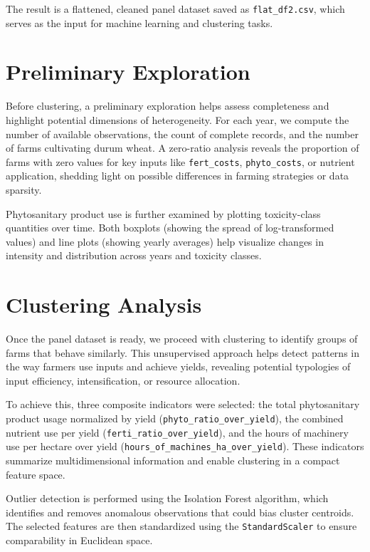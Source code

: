 \documentclass[a4paper,12pt]{article}
\begin{document}
The result is a flattened, cleaned panel dataset saved as \texttt{flat\_df2.csv}, which serves as the input for machine learning and clustering tasks.

\section{Preliminary Exploration}

Before clustering, a preliminary exploration helps assess completeness and highlight potential dimensions of heterogeneity. For each year, we compute the number of available observations, the count of complete records, and the number of farms cultivating durum wheat. A zero-ratio analysis reveals the proportion of farms with zero values for key inputs like \texttt{fert\_costs}, \texttt{phyto\_costs}, or nutrient application, shedding light on possible differences in farming strategies or data sparsity.

Phytosanitary product use is further examined by plotting toxicity-class quantities over time. Both boxplots (showing the spread of log-transformed values) and line plots (showing yearly averages) help visualize changes in intensity and distribution across years and toxicity classes.

\section{Clustering Analysis}

Once the panel dataset is ready, we proceed with clustering to identify groups of farms that behave similarly. This unsupervised approach helps detect patterns in the way farmers use inputs and achieve yields, revealing potential typologies of input efficiency, intensification, or resource allocation.

To achieve this, three composite indicators were selected: the total phytosanitary product usage normalized by yield (\texttt{phyto\_ratio\_over\_yield}), the combined nutrient use per yield (\texttt{ferti\_ratio\_over\_yield}), and the hours of machinery use per hectare over yield (\texttt{hours\_of\_machines\_ha\_over\_yield}). These indicators summarize multidimensional information and enable clustering in a compact feature space.

Outlier detection is performed using the Isolation Forest algorithm, which identifies and removes anomalous observations that could bias cluster centroids. The selected features are then standardized using the \texttt{StandardScaler} to ensure comparability in Euclidean space.
\end{document}
